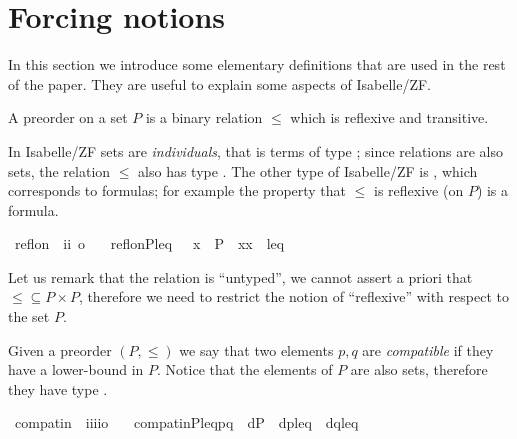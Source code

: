 \section{Forcing notions}\label{sec:forcing-posets}

In this section we introduce some elementary definitions that are used
in the rest of the paper. They are useful to explain some aspects of
Isabelle/ZF.

\begin{definition}
  A preorder on a set $P$ is a binary relation ${\leqslant}$ which is
  reflexive and transitive.
\end{definition}

In Isabelle/ZF sets are \emph{individuals}, that is terms of type
; since relations are also sets, the relation ${\leqslant}$
also has type . The other type of Isabelle/ZF is ,
which corresponds to formulas; for example the property that
${\leqslant}$ is reflexive (on $P$) is a formula.
\begin{isabelle}
\isamarkupfalse%
\ refl{\isacharunderscore}on\ {\isacharcolon}{\isacharcolon}\ {\isachardoublequoteopen}{\isacharbrackleft}i{\isacharcomma}i{\isacharbrackright}\ {\isasymRightarrow}o{\isachardoublequoteclose}\ \isanewline
\ \ {\isachardoublequoteopen}refl{\isacharunderscore}on{\isacharparenleft}P{\isacharcomma}leq{\isacharparenright}\ {\isacharequal}{\isacharequal}\ {\isasymforall}\ x\ {\isasymin}\ P\ {\isachardot}\ {\isasymlangle}x{\isacharcomma}x{\isasymrangle}\ {\isasymin}\ leq{\isachardoublequoteclose}
\end{isabelle}

Let us remark that the relation is ``untyped'', we cannot assert a
priori that ${\leqslant} \subseteq P \times P$, therefore we need to
restrict the notion of ``reflexive'' with respect to the set $P$.
\begin{definition}
  Given a preorder $(P,\leqslant)$ we say that two elements $p,q$ are
  \emph{compatible} if they have a lower-bound in $P$. Notice that
  the elements of $P$ are also sets, therefore they have type
  .
  \begin{isabelle}%
  \isamarkupfalse%
\ compat{\isacharunderscore}in\ {\isacharcolon}{\isacharcolon}\ {\isachardoublequoteopen}i{\isasymRightarrow}i{\isasymRightarrow}i{\isasymRightarrow}i{\isasymRightarrow}o{\isachardoublequoteclose}\ \isanewline
\ \ {\isachardoublequoteopen}compat{\isacharunderscore}in{\isacharparenleft}P{\isacharcomma}leq{\isacharcomma}p{\isacharcomma}q{\isacharparenright}\ {\isacharequal}{\isacharequal}\ {\isasymexists}d{\isasymin}P\ {\isachardot}\ {\isasymlangle}d{\isacharcomma}p{\isasymrangle}{\isasymin}leq\ {\isasymand}\ {\isasymlangle}d{\isacharcomma}q{\isasymrangle}{\isasymin}leq{\isachardoublequoteclose}
\end{isabelle}
\end{definition}

